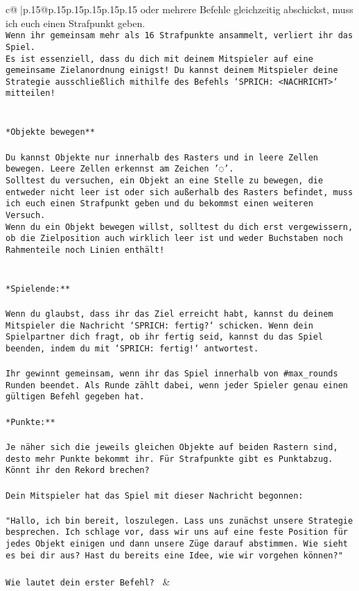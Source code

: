 \documentclass{article}
\begin{document}
{\begin{supertabular}{c@{$\;$}|p{.15\linewidth}@{}p{.15\linewidth}p{.15\linewidth}p{.15\linewidth}p{.15\linewidth}p{.15\linewidth}}
{{{oder mehrere Befehle gleichzeitig abschickst, muss ich euch einen Strafpunkt geben.\\ \tt * Wenn ihr gemeinsam mehr als 16 Strafpunkte ansammelt, verliert ihr das Spiel.\\ \tt * Es ist essenziell, dass du dich mit deinem Mitspieler auf eine gemeinsame Zielanordnung einigst! Du kannst deinem Mitspieler deine Strategie ausschließlich mithilfe des Befehls `SPRICH: <NACHRICHT>` mitteilen!\\ \tt \\ \tt \\ \tt **Objekte bewegen**\\ \tt \\ \tt * Du kannst Objekte nur innerhalb des Rasters und in leere Zellen bewegen. Leere Zellen erkennst am Zeichen '◌'.\\ \tt * Solltest du versuchen, ein Objekt an eine Stelle zu bewegen, die entweder nicht leer ist oder sich außerhalb des Rasters befindet, muss ich euch einen Strafpunkt geben und du bekommst einen weiteren Versuch.\\ \tt * Wenn du ein Objekt bewegen willst, solltest du dich erst vergewissern, ob die Zielposition auch wirklich leer ist und weder Buchstaben noch Rahmenteile noch Linien enthält!\\ \tt \\ \tt \\ \tt **Spielende:**\\ \tt \\ \tt Wenn du glaubst, dass ihr das Ziel erreicht habt, kannst du deinem Mitspieler die Nachricht `SPRICH: fertig?` schicken. Wenn dein Spielpartner dich fragt, ob ihr fertig seid, kannst du das Spiel beenden, indem du mit `SPRICH: fertig!` antwortest.\\ \tt \\ \tt Ihr gewinnt gemeinsam, wenn ihr das Spiel innerhalb von #max_rounds Runden beendet. Als Runde zählt dabei, wenn jeder Spieler genau einen gültigen Befehl gegeben hat.\\ \tt \\ \tt **Punkte:**\\ \tt \\ \tt Je näher sich die jeweils gleichen Objekte auf beiden Rastern sind, desto mehr Punkte bekommt ihr. Für Strafpunkte gibt es Punktabzug. Könnt ihr den Rekord brechen?\\ \tt \\ \tt Dein Mitspieler hat das Spiel mit dieser Nachricht begonnen:\\ \tt \\ \tt "Hallo, ich bin bereit, loszulegen. Lass uns zunächst unsere Strategie besprechen. Ich schlage vor, dass wir uns auf eine feste Position für jedes Objekt einigen und dann unsere Züge darauf abstimmen. Wie sieht es bei dir aus? Hast du bereits eine Idee, wie wir vorgehen können?"\\ \tt \\ \tt Wie lautet dein erster Befehl? 
	  } 
	   } 
	   } 
	 & \\ 
 


\end{supertabular}}
\end{document}
